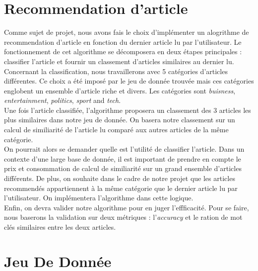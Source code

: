 \documentclass[a4paper,12pt]{article}
\begin{document}
\newpage
\maketitle
\tableofcontents

\newpage

\section{Recommendation d'article}


Comme sujet de projet, nous avons fais le choix d'implémenter un alogrithme de recommendation d'article en fonction du dernier article lu par l'utilisateur. Le fonctionnement de cet algorithme se décomposera en deux étapes principales : classifier l'article et fournir un classement d'articles similaires au dernier lu.\\

Concernant la classification, nous travaillerons avec 5 catégories d'articles différentes. Ce choix a été imposé par le jeu de donnée trouvée mais ces catégories englobent un ensemble d'article riche et divers. Les catégories sont \textit{buisness}, \textit{entertainment}, \textit{politics}, \textit{sport} and \textit{tech}.\\

Une fois l'article classifiée, l'algorithme proposera un classement des 3 articles les plus similaires dans notre jeu de donnée. On basera notre classement sur un calcul de similiarité de l'article lu comparé aux autres articles de la même catégorie.\\

On pourrait alors se demander quelle est l'utilité de classifier l'article. Dans un contexte d'une large base de donnée, il est important de prendre en compte le prix et consommation de calcul de similiarité sur un grand ensemble d'articles différents. De plus, on souhaite dans le cadre de notre projet que les articles recommendés appartiennent à la même catégorie que le dernier article lu par l'utilisateur. On implémentera l'algorithme dans cette logique.\\

Enfin, on devra valider notre algorithme pour en juger l'effficacité. Pour se faire, nous baserons la validation sur deux métriques : l'\textit{accuracy} et le ration de mot clés similaires entre les deux articles.

\section{Jeu De Donnée}
\end{document}
